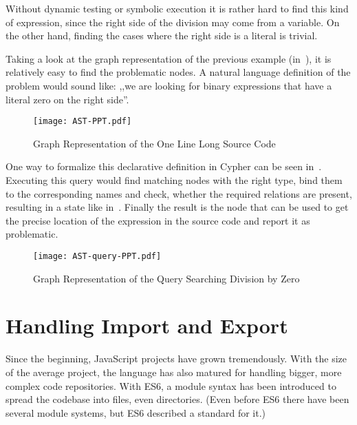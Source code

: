 Without dynamic testing or symbolic execution it is rather hard to find this kind of expression, since the right side of the division may come from a variable. On the other hand, finding the cases where the right side is a literal is trivial.

Taking a look at the graph representation of the previous example (in~), it is relatively easy to find the problematic nodes. A natural language definition of the problem would sound like: ,,we are looking for binary expressions that have a literal zero on the right side''.

\begin{figure}[!htb]
  \centering
  \texttt{[image: AST-PPT.pdf]}
  \caption{Graph Representation of the One Line Long Source Code}
  \label{fig:AST-PPT}
\end{figure}

One way to formalize this declarative definition in Cypher can be seen in~. Executing this query would find matching nodes with the right type, bind them to the corresponding names and check, whether the required relations are present, resulting in a state like in~. Finally the result is the  node that can be used to get the precise location of the expression in the source code and report it as problematic.

\begin{figure}[!htb]
	\begin{minipage}{\textwidth}
		
	\end{minipage}
\end{figure}

\begin{figure}[!htb]
  \centering
  \texttt{[image: AST-query-PPT.pdf]}
  \caption{Graph Representation of the Query Searching Division by Zero}
  \label{fig:AST-query-PPT}
\end{figure}

\section{Handling Import and Export}
Since the beginning, JavaScript projects have grown tremendously. With the size of the average project, the language has also matured for handling bigger, more complex code repositories. With ES6, a module syntax has been introduced to spread the codebase into files, even directories. (Even before ES6 there have been several module systems, but ES6 described a standard for it.)

